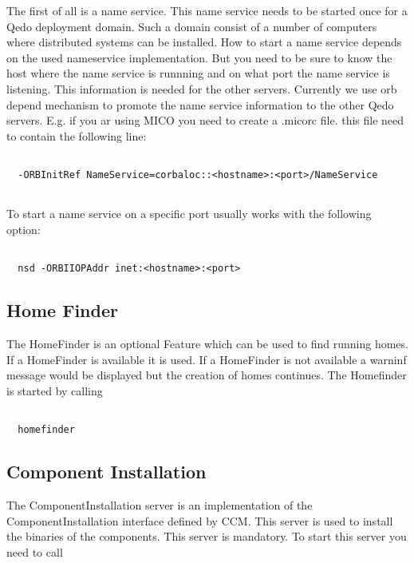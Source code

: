 \documentclass[12pt,a4paper]{report}
\begin{document}
The first of all is a name service. This name service needs to be started once for a Qedo deployment domain. Such a domain consist of a number of computers where distributed systems can be installed. How to start a name service depends on the used nameservice implementation. But you need to be sure to know the host where the name service is runnning and on what port the name service is listening. This information is needed for the other servers. Currently we use orb depend mechanism to promote the name service information to the other Qedo servers. E.g. if you ar using MICO you need to create a .micorc file. this file need to contain the following line:
\small
\begin{verbatim}

  -ORBInitRef NameService=corbaloc::<hostname>:<port>/NameService
  
\end{verbatim}
\normalsize

To start a name service on a specific port usually works with the following option:

\small
\begin{verbatim}

  nsd -ORBIIOPAddr inet:<hostname>:<port>

\end{verbatim}
\normalsize

\subsection{Home Finder}
\label{sec:HomeFinder}

The HomeFinder is an optional Feature which can be used to find running homes. If a HomeFinder is available it is used. If a HomeFinder is not available a warninf message would be displayed but the creation of homes continues. The Homefinder is started by calling

\small
\begin{verbatim}

  homefinder

\end{verbatim}
\normalsize

\subsection{Component Installation}
\label{sec:ComponentInstallation}
The ComponentInstallation server is an implementation of the ComponentInstallation interface defined by CCM. This server is used to install the binaries of the components. This server is mandatory. To start this server you need to call
\end{document}

